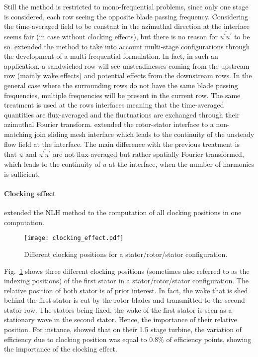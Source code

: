 Still the method is restricted to mono-frequential problems, since only
one stage is considered, each row seeing the
opposite blade passing frequency. Considering
the time-averaged field to be constant in the azimuthal 
direction at the interface seems fair (in case 
without clocking effects), 
but there is
no reason for $\overline{u^\prime u^\prime}$ to be so.
\citet{He2002} extended the method to take into
account multi-stage configurations through the
development of a multi-frequential formulation.
In fact, in such an application, 
a sandwiched row will see unsteadinesses coming
from the upstream row (mainly wake effects) and
potential effects from the downstream rows. In the
general case where the surrounding rows do not have the
same blade passing frequencies, multiple frequencies
will be present in the current row.
The same treatment is used at the rows interfaces meaning
that the time-averaged quantities are flux-averaged and the
fluctuations are exchanged through their azimuthal
Fourier transform.
\citet{Vilmin2006} extended the rotor-stator
interface to a non-matching join sliding mesh interface which
leads to the continuity of the unsteady flow field at the interface.
The main difference with the previous treatment is that
$\overline{u}$ and $\overline{u^\prime u^\prime}$ 
are not flux-averaged but rather spatially Fourier transformed,
which leads to the continuity of $u$ at the interface, when
the number of harmonics is sufficient.

\paragraph{Clocking effect}
\citet{He2002} extended the NLH method to
the computation of all clocking positions in one computation.
\begin{figure}[htbp]
  \centering 
  \texttt{[image: clocking\_effect.pdf]}
  \caption{Different clocking positions for a stator/rotor/stator
  configuration.}
  \label{fig:sm_nlh_clocking_effect}
\end{figure}
Fig.~\ref{fig:sm_nlh_clocking_effect} shows three
different clocking positions (sometimes also referred 
to as the indexing positions)
of the first stator
in a stator/rotor/stator configuration.
The relative position of both stator is of
prior interest. In fact, the wake that is shed behind the first stator
is cut by the rotor blades and transmitted to 
the second stator row. The stators being fixed, the wake of
the first stator is seen as a stationary wave in the second stator.
Hence, the importance of their relative position. For instance,
\citet{Huber1996} showed that
on their 1.5 stage turbine, the variation of efficiency due to clocking
position was equal to $0.8\%$ of efficiency points, showing the
importance of the clocking effect.

